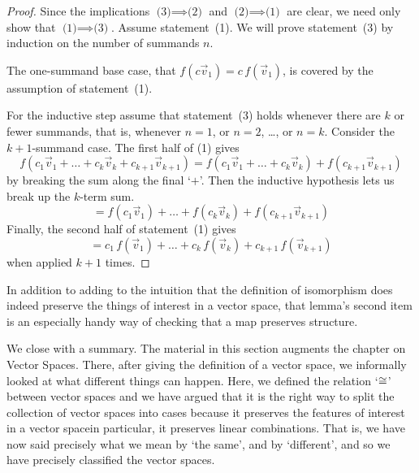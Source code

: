 \begin{proof}
Since the implications \mbox{$\text{(3)}\!\implies\!\text{(2)}$} and 
\mbox{$\text{(2)}\!\implies\!\text{(1)}$}
are clear, we need only show that \mbox{$\text{(1)}\!\implies\!\text{(3)}$}.
Assume statement~(1).
We will prove statement~(3) by induction on the number of summands $n$.

The one-summand base case, that
\( f(c\vec{v}_1)=c\,f(\vec{v}_1) \), is covered by the assumption of
statement~(1).

For the inductive step assume that statement~(3) holds whenever 
there are \( k \) or fewer summands, that is, whenever
$n=1$, or $n=2$, \ldots, or $n=k$.
Consider the $k+1$-summand case.
The first half of (1) gives
\begin{equation*}
  f(c_1\vec{v}_1+\dots+c_k\vec{v}_k+c_{k+1}\vec{v}_{k+1})
  =f(c_1\vec{v}_1+\dots+c_k\vec{v}_k)+f(c_{k+1}\vec{v}_{k+1})
\end{equation*}
by breaking the sum along the final `$+$'.
Then the inductive hypothesis lets us break up the $k$-term sum.
\begin{equation*}
  =f(c_1\vec{v}_1)+\dots+f(c_k\vec{v}_k)+f(c_{k+1}\vec{v}_{k+1})
\end{equation*}
Finally, the second half of statement~(1) gives
\begin{equation*}
  =c_1\,f(\vec{v}_1)+\dots+c_k\,f(\vec{v}_k)+c_{k+1}\,f(\vec{v}_{k+1})
\end{equation*}
when applied $k+1$ times.
\end{proof}

In addition to adding to the intuition that the definition of isomorphism
does indeed preserve the things of interest in a vector space, 
that lemma's second item is an especially handy way of
checking that a map preserves structure.

We close with a summary.
The material in this section augments the chapter on Vector Spaces.
There, after giving the definition of a vector space, 
we informally looked at what different things can happen.
Here, we defined the relation 
`\( \cong \)' between vector spaces and 
we have argued that it
is the right way to split the collection of vector spaces
into cases because it preserves the features of interest in a vector
space\Dash in particular, it preserves linear combinations.
That is, we have now said precisely what we mean by `the same', 
and by `different', and so we have precisely classified the vector spaces.


